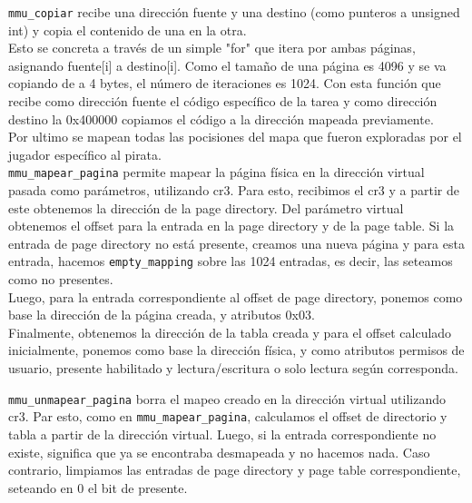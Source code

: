 \texttt{mmu\_copiar} recibe una dirección fuente y una destino (como punteros a unsigned int) y copia el contenido de una en la otra.\\

Esto se concreta a través de un simple "for" que itera por ambas páginas, asignando fuente[i] a destino[i]. Como el tamaño de una página es 4096 y se va copiando de a 4 bytes, el número de iteraciones es 1024. Con esta función que recibe como dirección fuente el código específico de la tarea y como dirección destino la 0x400000 copiamos el código a la dirección mapeada previamente.\\


Por ultimo se mapean todas las pocisiones del mapa que fueron exploradas por el jugador específico al pirata.\\ 


\texttt{mmu\_mapear\_pagina} permite mapear la página física en la dirección virtual pasada como parámetros, utilizando cr3. Para esto, recibimos el cr3 y a partir de este obtenemos la dirección de la page directory. Del parámetro virtual obtenemos el offset para la entrada en la page directory y de la page table. Si la entrada de page directory no está presente, creamos una nueva página y para esta entrada, hacemos \texttt{empty\_mapping} sobre las 1024 entradas, es decir, las seteamos como no presentes.\\

Luego, para la entrada correspondiente al offset de page directory, ponemos como base la dirección de la página creada, y atributos 0x03.\\

Finalmente, obtenemos la dirección de la tabla creada y para el offset calculado inicialmente, ponemos como base la dirección física, y como atributos permisos de usuario, presente habilitado y lectura/escritura o solo lectura según corresponda.

\texttt{mmu\_unmapear\_pagina} borra el mapeo creado en la dirección virtual utilizando cr3. Par esto, como en \texttt{mmu\_mapear\_pagina}, calculamos el offset de directorio y tabla a partir de la dirección virtual. Luego, si la entrada correspondiente no existe, significa que ya se encontraba desmapeada y no hacemos nada. Caso contrario, limpiamos las entradas de page directory y page table correspondiente, seteando en 0 el bit de presente.